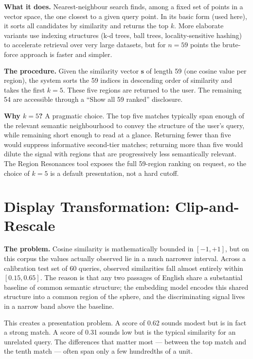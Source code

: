 \documentclass[11pt]{article}
\begin{document}
\textbf{What it does.} Nearest-neighbour search finds, among a fixed set of points in a vector space, the one closest to a given query point. In its basic form (used here), it sorts all candidates by similarity and returns the top $k$. More elaborate variants use indexing structures (k-d trees, ball trees, locality-sensitive hashing) to accelerate retrieval over very large datasets, but for $n = 59$ points the brute-force approach is faster and simpler.

\textbf{The procedure.} Given the similarity vector $\mathbf{s}$ of length 59 (one cosine value per region), the system sorts the 59 indices in descending order of similarity and takes the first $k = 5$. These five regions are returned to the user. The remaining 54 are accessible through a ``Show all 59 ranked'' disclosure.

\textbf{Why $k = 5$?} A pragmatic choice. The top five matches typically span enough of the relevant semantic neighbourhood to convey the structure of the user's query, while remaining short enough to read at a glance. Returning fewer than five would suppress informative second-tier matches; returning more than five would dilute the signal with regions that are progressively less semantically relevant. The Region Resonances tool exposes the full 59-region ranking on request, so the choice of $k = 5$ is a default presentation, not a hard cutoff.

\section{Display Transformation: Clip-and-Rescale}

\textbf{The problem.} Cosine similarity is mathematically bounded in $[-1, +1]$, but on this corpus the values actually observed lie in a much narrower interval. Across a calibration test set of 60 queries, observed similarities fall almost entirely within $[0.15, 0.65]$. The reason is that any two passages of English share a substantial baseline of common semantic structure; the embedding model encodes this shared structure into a common region of the sphere, and the discriminating signal lives in a narrow band above the baseline.

This creates a presentation problem. A score of 0.62 sounds modest but is in fact a strong match. A score of 0.31 sounds low but is the typical similarity for an unrelated query. The differences that matter most --- between the top match and the tenth match --- often span only a few hundredths of a unit.
\end{document}
